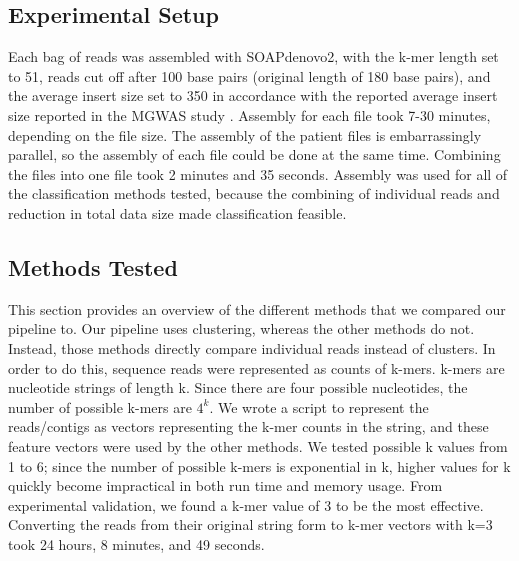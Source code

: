 
\subsection{Experimental Setup}

Each bag of reads was assembled with SOAPdenovo2, with the k-mer length set to 51, reads cut off after 100 base pairs (original length of 180 base pairs), and the average insert size set to 350 in accordance with the reported average insert size reported in the MGWAS study \cite{qin041012}. Assembly for each file took 7-30 minutes, depending on the file size. The assembly of the patient files is embarrassingly parallel, so the assembly of each file could be done at the same time. Combining the files into one file took 2 minutes and 35 seconds. Assembly was used for all of the classification methods tested, because the combining of individual reads and reduction in total data size made classification feasible.

\subsection{Methods Tested}

This section provides an overview of the different methods that we compared our pipeline to. Our pipeline uses clustering, whereas the other methods do not. Instead, those methods directly compare individual reads instead of clusters. In order to do this, sequence reads were represented as counts of k-mers. k-mers are nucleotide strings of 
length k. Since there are four possible nucleotides, the number
of possible k-mers are \(4^k\). 
We wrote a script to represent the reads/contigs as vectors representing the k-mer counts in the string, and these feature 
vectors were used by the other methods. We tested possible k values 
from 1 to 6; since the number of possible k-mers is 
exponential in k, higher values for k quickly become impractical in both run time and memory usage. From experimental validation, we found a k-mer value of 3 to be the most effective. Converting the reads from their original string form to k-mer vectors with k=3 took 24 hours, 8 minutes, and 49 seconds.


